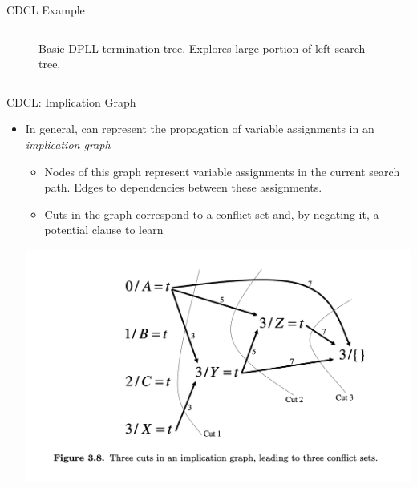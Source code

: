 \documentclass{beamer}
\begin{document}
\begin{frame}{CDCL Example}
\begin{columns}
        \begin{column}{0.70\textwidth}
            \begin{figure}
                
                \caption{Basic DPLL termination tree. Explores large portion of left search tree.}
            \end{figure}
        \end{column}
    \end{columns}
\end{frame}


\begin{frame}{CDCL: Implication Graph}
    \begin{itemize}
        \item In general, can represent the propagation of variable assignments in an \textit{implication graph}
        \pause
        \begin{itemize}
            \item Nodes of this graph represent variable assignments in the current search path. Edges to dependencies between these assignments.
            \item Cuts in the graph correspond to a conflict set and, by negating it, a potential clause to learn
        \end{itemize}
        \begin{center}
            \includegraphics[scale=0.3]{figures/implication-graph.png}
        \end{center}
\end{itemize}
\end{frame}
\end{document}
